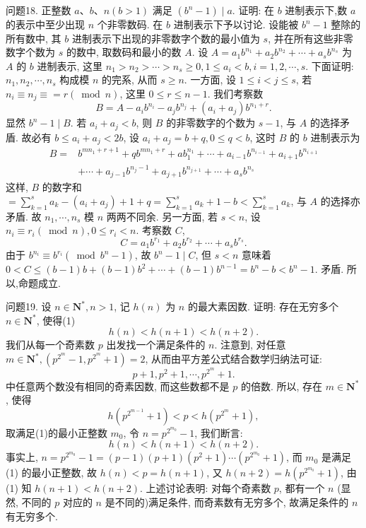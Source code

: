 问题18. 正整数 $a 、 b 、 n(b>1)$ 满足 $\left(b^n-1\right) \mid a$.
证明: 在 $b$ 进制表示下,数 $a$ 的表示中至少出现 $n$ 个非零数码.
在 $b$ 进制表示下予以讨论.
设能被 $b^n-1$ 整除的所有数中, 其 $b$ 进制表示下出现的非零数字个数的最小值为 $s$, 并在所有这些非零数字个数为 $s$ 的数中, 取数码和最小的数 $A$.
设 $A=a_1 b^{n_1}+a_2 b^{n_2}+\cdots+a_s b^{n_s}$ 为 $A$ 的 $b$ 进制表示, 这里
$n_1>n_2>\cdots>n_s \geqslant 0,1 \leqslant a_i<b, i=1,2, \cdots, s$.
下面证明: $n_1, n_2, \cdots, n_s$ 构成模 $n$ 的完系, 从而 $s \geqslant n$.
一方面, 设 $1 \leqslant i<j \leqslant s$, 若 $n_i \equiv n_j \equiv=r(\bmod n)$, 这里 $0 \leqslant r \leqslant n-1$. 我们考察数
$$
B=A-a_i b^{n_i}-a_j b^{n_j}+\left(a_i+a_j\right) b^{n_1+r} .
$$
显然 $b^n-1 \mid B$. 若 $a_i+a_j<b$, 则 $B$ 的非零数字的个数为 $s-1$, 与 $A$ 的选择矛盾.
故必有 $b \leqslant a_i+a_j<2 b$, 设 $a_i+a_j=b+q, 0 \leqslant q<b$, 这时 $B$ 的 $b$ 进制表示为
$$
\begin{aligned}
B= & b^{m n_1+r+1}+q b^{m n_1+r}+a b_1^{n_1}+\cdots+a_{i-1} b^{n_{i-1}}+a_{i+1} b^{n_{i+1}} \\
& +\cdots+a_{j-1} b^{n_j-1}+a_{j+1} b^{n_{j+1}}+\cdots+a_s b^{n_s}
\end{aligned}
$$
这样, $B$ 的数字和 $=\sum_{k=1}^s a_k-\left(a_i+a_j\right)+1+q=\sum_{k=1}^s a_k+1-b<\sum_{k=1}^s a_k$, 与 $A$ 的选择亦矛盾.
故 $n_1, \cdots, n_s$ 模 $n$ 两两不同余.
另一方面, 若 $s<n$, 设 $n_i \equiv r_i(\bmod n), 0 \leqslant r_i<n$. 考察数 $C$,
$$
C=a_1 b^{r_1}+a_2 b^{r_2}+\cdots+a_s b^{r_s} .
$$
由于 $b^{n_i} \equiv b^{r_i}\left(\bmod b^n-1\right)$, 故 $b^n-1 \mid C$, 但 $s<n$ 意味着 $0<C \leqslant(b-1) b+(b-1) b^2+\cdots+(b-1) b^{n-1}=b^n-b<b^n-1$. 矛盾.
所以,命题成立.



问题19. 设 $n \in \mathbf{N}^*, n>1$, 记 $h(n)$ 为 $n$ 的最大素因数.
证明: 存在无穷多个 $n \in \mathbf{N}^*$, 使得(1)
$$
h(n)<h(n+1)<h(n+2) .
$$
我们从每一个奇素数 $p$ 出发找一个满足条件的 $n$.
注意到, 对任意 $m \in \mathbf{N}^*,\left(p^{2^m}-1, p^{2^m}+1\right)=2$, 从而由平方差公式结合数学归纳法可证:
$$
p+1, p^2+1, \cdots, p^{2^m}+1 .
$$
中任意两个数没有相同的奇素因数, 而这些数都不是 $p$ 的倍数.
所以, 存在 $m \in \mathbf{N}^*$, 使得
$$
h\left(p^{2^{m-1}}+1\right)<p<h\left(p^{2^m}+1\right),
$$
取满足(1)的最小正整数 $m_0$, 令 $n=p^{2^{m_0}}-1$, 我们断言:
$$
h(n)<h(n+1)<h(n+2) .
$$
事实上, $n=p^{2^{m_0}}-1=(p-1)(p+1)\left(p^2+1\right) \cdots\left(p^{2^{m_0}}+1\right)$, 而 $m_0$ 是满足 (1) 的最小正整数, 故 $h(n)<p=h(n+1)$, 又 $h(n+2)=h\left(p^{2^{m_0}}+1\right)$, 由 (1) 知 $h(n+1)<h(n+2)$.
上述讨论表明: 对每个奇素数 $p$, 都有一个 $n$ (显然, 不同的 $p$ 对应的 $n$ 是不同的)满足条件, 而奇素数有无穷多个, 故满足条件的 $n$ 有无穷多个.



